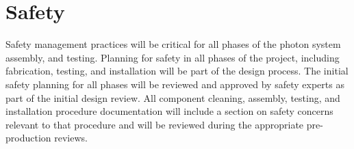 \section{Safety}
\label{sec:fdsp-pd-safety}

Safety management practices will be critical for all phases of the photon system assembly, and testing.  Planning for safety in all phases of the project, including fabrication, testing, and installation will be part of the design process.  The initial safety planning for all phases will be reviewed and approved by safety experts as part of the initial design review.  All component cleaning, assembly, testing,  and installation procedure documentation will include a section on safety concerns relevant to that procedure and will be reviewed during the appropriate pre-production reviews.


